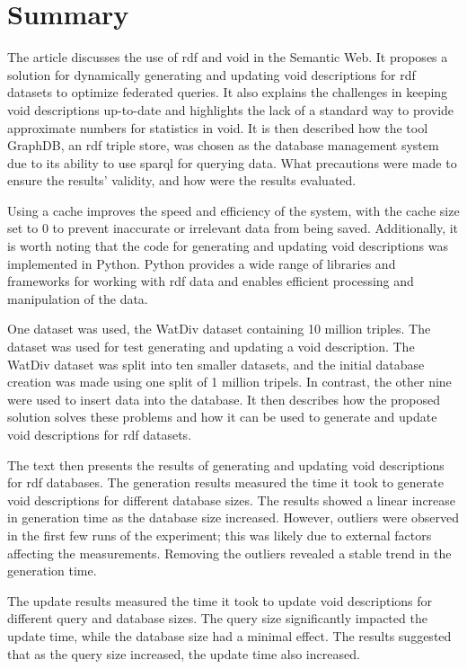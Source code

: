 \section{Summary}\label{sec:summary}
The article discusses the use of \gls{rdf} and \gls{void} in the Semantic Web. It proposes a solution for dynamically generating and updating \gls{void} descriptions for \gls{rdf} datasets to optimize federated queries. It also explains the challenges in keeping \gls{void} descriptions up-to-date and highlights the lack of a standard way to provide approximate numbers for statistics in \gls{void}. It is then described how the tool GraphDB, an \gls{rdf} triple store, was chosen as the database management system due to its ability to use \gls{sparql} for querying data. What precautions were made to ensure the results' validity, and how were the results evaluated.

Using a cache improves the speed and efficiency of the system, with the cache size set to 0 to prevent inaccurate or irrelevant data from being saved. Additionally, it is worth noting that the code for generating and updating \gls{void} descriptions was implemented in Python. Python provides a wide range of libraries and frameworks for working with \gls{rdf} data and enables efficient processing and manipulation of the data.

One dataset was used, the WatDiv dataset containing 10 million triples. The dataset was used for test generating and updating a \gls{void} description. The WatDiv dataset was split into ten smaller datasets, and the initial database creation was made using one split of 1 million tripels. In contrast, the other nine were used to insert data into the database. It then describes how the proposed solution solves these problems and how it can be used to generate and update \gls{void} descriptions for \gls{rdf} datasets.

The text then presents the results of generating and updating \gls{void} descriptions for \gls{rdf} databases. The generation results measured the time it took to generate \gls{void} descriptions for different database sizes. The results showed a linear increase in generation time as the database size increased. However, outliers were observed in the first few runs of the experiment; this was likely due to external factors affecting the measurements. Removing the outliers revealed a stable trend in the generation time.

The update results measured the time it took to update \gls{void} descriptions for different query and database sizes. The query size significantly impacted the update time, while the database size had a minimal effect. The results suggested that as the query size increased, the update time also increased.

